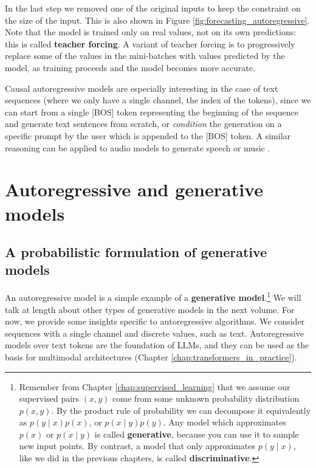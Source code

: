 In the last step we removed one of the original inputs to keep the constraint on the size of the input. This is also shown in Figure \ref{fig:forecasting_autoregressive}. Note that the model is trained only on real values, not on its own predictions: this is called \textbf{teacher forcing}. A variant of teacher forcing is to progressively replace some of the values in the mini-batches with values predicted by the model, as training proceeds and the model becomes more accurate. 

Causal autoregressive models are especially interesting in the case of text sequences (where we only have a single channel, the index of the tokens), since we can start from a single [BOS] token representing the beginning of the sequence and generate text sentences from scratch, or \textit{condition} the generation on a specific prompt by the user which is appended to the [BOS] token. A similar reasoning can be applied to audio models to generate speech or music \cite{oord2016wavenet}.

\section{Autoregressive and generative models}
\subsection{A probabilistic formulation of generative models}
\label{subsec:probabilistic_formulation_generative_models} \addteacup

An autoregressive model is a simple example of a \textbf{generative model}.\footnote{Remember from Chapter \ref{chap:supervised_learning} that we assume our supervised pairs $(x,y)$ come from some unknown probability distribution $p(x,y)$. By the product rule of probability we can decompose it equivalently as $p(y \mid x)p(x)$, or $p(x \mid y)p(y)$. Any model which approximates $p(x)$ or $p(x \mid y)$ is called \textbf{generative}, because you can use it to sample new input points. By contrast, a model that only approximates $p(y \mid x)$, like we did in the previous chapters, is called \textbf{discriminative}.} We will talk at length about other types of generative models in the next volume. For now, we provide some insights specific to autoregressive algorithms. We consider sequences with a single channel and discrete values, such as text. Autoregressive models over text tokens are the foundation of LLMs, and they can be used as the basis for multimodal architectures (Chapter \ref{chap:transformers_in_practice}).

